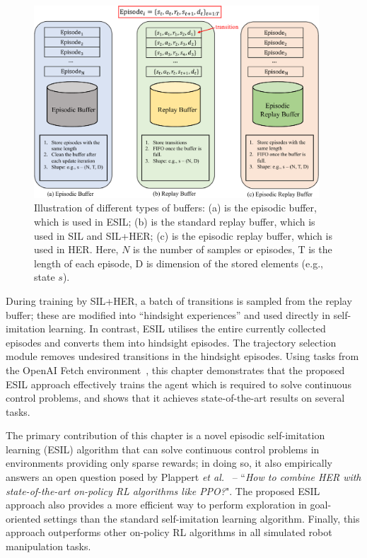 \begin{figure}[h]
\centering
\includegraphics[width=0.95\textwidth]{figures/chapter3/buffer_type.pdf}
\caption[Illustration of different types of buffer.]{Illustration of different types of buffers: (a) is the episodic buffer, which is used in ESIL; (b) is the standard replay buffer, which is used in SIL and SIL+HER; (c) is the episodic replay buffer, which is used in HER. Here, $N$ is the number of samples or episodes, T is the length of each episode, D is dimension of the stored elements (e.g., state $s$).}
\label{fig:type_buffer}
\end{figure}


During training by SIL+HER, a batch of transitions is sampled from the replay buffer; these are modified into ``hindsight experiences'' and used directly in self-imitation learning. In contrast, ESIL utilises the entire currently collected episodes and converts them into hindsight episodes. The trajectory selection module removes undesired transitions in the hindsight episodes. Using tasks from the OpenAI Fetch environment~\cite{plappert2018multi}, this chapter demonstrates that the proposed ESIL approach effectively trains the agent which is required to solve continuous control problems, and shows that it achieves state-of-the-art results on several tasks.

The primary contribution of this chapter is a novel episodic self-imitation learning (ESIL) algorithm that can solve continuous control problems {in environments providing only sparse rewards}; in doing so, it also empirically answers an open question posed by Plappert \textit{et al.}~\cite{plappert2018multi} -- ``\textit{How to combine HER with state-of-the-art on-policy RL algorithms like
PPO?}". {The proposed ESIL approach also provides} a more efficient way to perform exploration in goal-oriented settings than the standard self-imitation learning algorithm. 
Finally, this approach outperforms other on-policy RL algorithms in all simulated robot manipulation tasks.

